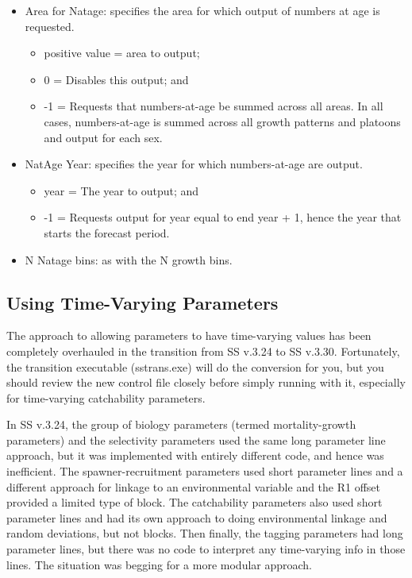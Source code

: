 \begin{itemize}
	\item 	Area for Natage: specifies the area for which output of numbers at age is requested. 
	\begin{itemize}
		\item positive value = area to output;
		\item 0 = Disables this output; and
		\item -1 = Requests that numbers-at-age be summed across all areas.  In all cases, numbers-at-age is summed across all growth patterns and platoons and output for each sex.
	\end{itemize}

	\item 	NatAge Year:  specifies the year for which numbers-at-age are output.  
	\begin{itemize}
		\item year = The year to output; and
		\item -1 = Requests output for year equal to end year + 1, hence the year that starts the forecast period.
	\end{itemize}

	\item N Natage bins: as with the N growth bins.
\end{itemize}



\hypertarget{TVpara}{}
\subsection{Using Time-Varying Parameters}
The approach to allowing parameters to have time-varying values has been completely overhauled in the transition from SS v.3.24 to SS v.3.30.  Fortunately, the transition executable (sstrans.exe) will do the conversion for you, but you should review the new control file closely before simply running with it, especially for time-varying catchability parameters.

In SS v.3.24, the group of biology parameters (termed mortality-growth parameters) and the selectivity parameters used the same long parameter line approach, but it was implemented with entirely different code, and hence was inefficient. The spawner-recruitment parameters used short parameter lines and a different approach for linkage to an environmental variable and the R1 offset provided a limited type of block. The catchability parameters also used short parameter lines and had its own approach to doing environmental linkage and random deviations, but not blocks. Then finally, the tagging parameters had long parameter lines, but there was no code to interpret any time-varying info in those lines.  The situation was begging for a more modular approach.

